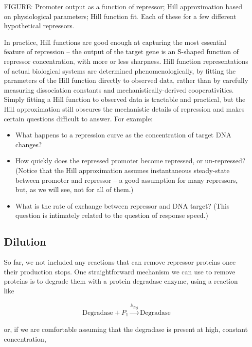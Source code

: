 \documentclass[preprint,12pt]{elsarticle}
\begin{document}
\vspace{.5in}
FIGURE: Promoter output as a function of repressor; Hill approximation based on physiological parameters; Hill function fit. Each of these for a few different hypothetical repressors.
\vspace{.5in}

In practice, Hill functions are good enough at capturing the most essential feature of repression -- the output of the target gene is an S-shaped function of repressor concentration, with more or less sharpness. Hill function representations of actual biological systems are determined phenomenologically, by fitting the parameters of the Hill function directly to observed data, rather than by carefully measuring dissociation constants and mechanistically-derived cooperativities. Simply fitting a Hill function to observed data is tractable and practical, but the Hill approximation still obscures the mechanistic details of repression and makes certain questions difficult to answer. For example:

\begin{itemize}
	\item What happens to a repression curve as the concentration of target DNA changes?
	\item How quickly does the repressed promoter become repressed, or un-repressed? (Notice that the Hill approximation assumes instantaneous steady-state between promoter and repressor -- a good assumption for many repressors, but, as we will see, not for all of them.)
	\item What is the rate of exchange between repressor and DNA target? (This question is intimately related to the question of response speed.)
\end{itemize}

\subsection{Dilution}

So far, we not included any reactions that can remove repressor proteins once their production stops. One straightforward mechanism we can use to remove proteins is to degrade them with a protein degradase enzyme, using a reaction like 

\begin{align}\label{eq:deg1}
	\text{Degradase} + P_1 \xrightarrow{k_{deg}} \text{Degradase}
\end{align}

or, if we are comfortable assuming that the degradase is present at high, constant concentration,
\end{document}
